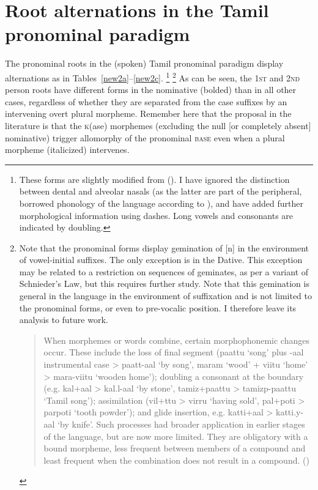 \documentclass[output=paper]{langscibook}
\begin{document}
\section{Root alternations in the Tamil pronominal paradigm}\label{sec:newell:2}

The pronominal roots in the (spoken) Tamil pronominal paradigm display alternations as in Tables~\ref{new2a}--\ref{new2c}.%
    \footnote{These forms are slightly modified from (\citealt[110]{steever2019dravidian}). I have ignored the distinction between dental and alveolar nasals (as the latter are part of the peripheral, borrowed phonology of the language according to \citeauthor{steever2019dravidian}), and have added further morphological information using dashes. Long vowels and consonants are indicated by doubling.}%
    \footnote{\label{fn:newell:3}Note that the pronominal forms display gemination of [n] in the environment of vowel-initial suffixes. The only exception is in the Dative. This exception may be related to a restriction on sequences of geminates, as per a variant of Schnieder’s Law, but this requires further study. Note that this gemination is general in the language in the environment of suffixation and is not limited to the pronominal forms, or even to pre-vocalic position. I therefore leave its analysis to future work. 
        \begin{quote}
            When morphemes or words combine, certain morphophonemic changes occur. These include the loss of final segment (paattu ‘song’ plus -aal instrumental case > paatt-aal ‘by song’, maram ‘wood’ + viitu ‘home’ > mara-viitu ‘wooden home’); doubling a consonant at the boundary (e.g. kal+aal > kal.l-aal ‘by stone’, tamiz+paattu > tamizp-paattu ‘Tamil song’); assimilation (vil+ttu > virru ‘having sold’, pal+poti > parpoti ‘tooth powder’); and glide insertion, e.g. katti+aal > katti.y-aal ‘by knife’. Such processes had broader application in earlier stages of the language, but are now more limited. They are obligatory with a bound morpheme, less frequent between members of a compound and least frequent when the combination does not result in a compound. \hfill\hbox{(\citealt[103]{steever2019dravidian})}
        \end{quote}
    } 
As can be seen, the 1\textsc{st} and 2\textsc{nd} person roots have different forms in the nominative (bolded) than in all other cases, regardless of whether they are separated from the case suffixes by an intervening overt plural morpheme. Remember here that the proposal in the literature is that the \textsc{k}(ase) morphemes (excluding the null [or completely absent] nominative) trigger allomorphy of the pronominal \textsc{base} even when a plural morpheme (italicized) intervenes.
\end{document}
